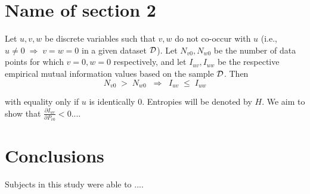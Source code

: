 \documentclass[twoside,11pt]{article}
\newcommand{\dataset}{{\cal D}}
\newcommand{\fracpartial}[2]{\frac{\partial #1}{\partial  #2}}
\begin{document}

\section{Name of section 2}


 Let $u,v,w$ be discrete variables such that $v, w$ do
not co-occur with $u$ (i.e., $u\neq0\;\Rightarrow \;v=w=0$ in a given
dataset $\dataset$). Let $N_{v0},N_{w0}$ be the number of data points for
which $v=0, w=0$ respectively, and let $I_{uv},I_{uw}$ be the
respective empirical mutual information values based on the sample
$\dataset$. Then
\begin{equation}
N_{v0} \;>\; N_{w0}\;\;\Rightarrow\;\;I_{uv} \;\leq\;I_{uw}
\end{equation}

with equality only if $u$ is identically 0.
 Entropies will be denoted
by $H$. We aim to show that $\fracpartial{I_{uv}}{P_{v0}} < 0$....\\

\section{Conclusions}

Subjects in this study were able to ....

\vskip 0.2in


\end{document}
